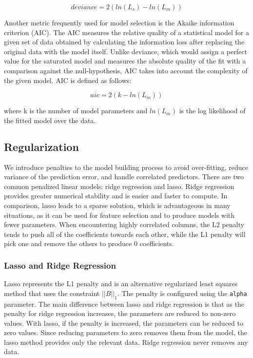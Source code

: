 \[ deviance = 2({ln(L_{s})} - {ln(L_{m})}) \]

Another metric frequently used for model selection is the Akaike information criterion (AIC). The AIC measures the
relative quality of a statistical model for a given set of data obtained by calculating the information loss after
replacing the original data with the model itself. Unlike deviance, which would assign a perfect value for the
saturated model and measures the absolute quality of the fit with a comparison against the null-hypothesis, AIC
takes into account the complexity of the given model. AIC is defined as follows:

\[ aic = 2(k - ln(L_{m}))\]

where k is the number of model parameters and $ln(L_{m})$ is the log likelihood of the fitted model over the data.

\subsection{Regularization} \label{regularization}
We introduce penalties to the model building process to avoid over-fitting, reduce variance of the prediction
error, and handle correlated predictors. There are two common penalized linear models: ridge regression and
lasso. Ridge regression provides greater numerical stability and is easier and faster to compute. In comparison,
lasso leads to a sparse solution, which is advantageous in many situations, as it can be used for feature selection
and to produce models with fewer parameters. When encountering highly correlated columns, the L2 penalty tends to
push all of the coefficients towards each other, while the L1 penalty will pick one and remove the others to
produce 0 coefficients.

\subsubsection{Lasso and Ridge Regression}

Lasso represents the L1 penalty and is an alternative regularized least squares method that uses the constraint
$||B||_1$. The penalty is configured using the \texttt{alpha} parameter. The main difference between lasso and
ridge regression is that as the penalty for ridge regression increases, the parameters are reduced to non-zero
values. With lasso, if the penalty is increased, the parameters can be reduced to zero values. Since reducing
parameters to zero removes them from the model, the lasso method provides only the relevant data. Ridge regression
never removes any data.

